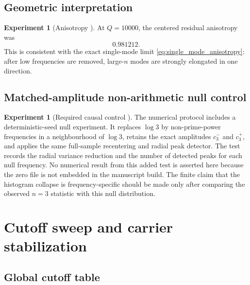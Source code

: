 \documentclass[11pt]{amsart}
\numberwithin{equation}{section}
\theoremstyle{plain}
\theoremstyle{definition}
\newtheorem{experiment}[theorem]{Experiment}
\theoremstyle{remark}
\newcommand{\1}{\mathbf{1}}
\begin{document}
\subsection{Geometric interpretation}
\label{subsec:numerical_geometric_interpretation}

\begin{experiment}[Anisotropy {\normalfont[Numerical]}]
\label{exp:numerical_anisotropy}
At $Q=10000$, the centered residual anisotropy was
\begin{equation}
0.981212.
\label{eq:numerical_anisotropy_value}
\end{equation}
This is consistent with the exact single-mode limit
\eqref{eq:single_mode_anisotropy}: after low frequencies are removed,
large-$n$ modes are strongly elongated in one direction.
\end{experiment}


\subsection{Matched-amplitude non-arithmetic null control}
\label{subsec:n3_null_control}

\begin{experiment}[Required causal control {\normalfont[Numerical]}]
\label{exp:n3_matched_null_control}
The numerical protocol includes a deterministic-seed null experiment.  It
replaces $\log3$ by non-prime-power frequencies in a neighbourhood of
$\log3$, retains the exact amplitudes $c_3^-$ and $c_3^+$, and applies the
same full-sample recentering and radial peak detector.  The test records the radial
variance reduction and the number of detected peaks for each null frequency.
No numerical result from this added test is asserted here because the zero
file is not embedded in the manuscript build.  The finite claim that the
histogram collapse is frequency-specific should be made only after comparing
the observed $n=3$ statistic with this null distribution.
\end{experiment}

\section{Cutoff sweep and carrier stabilization}
\label{sec:numerical_cutoff_sweep}

\subsection{Global cutoff table}
\label{subsec:numerical_global_cutoff_table}
\end{document}
